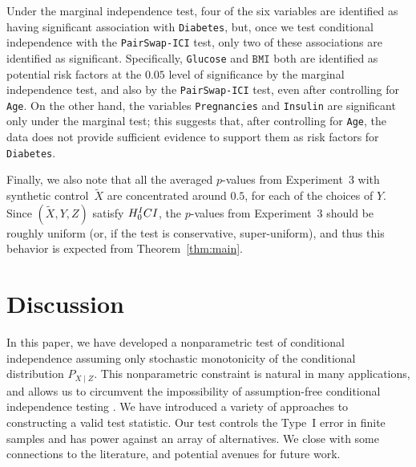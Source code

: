 \documentclass[12pt]{article}
\begin{document}
Under the marginal independence test, four of the six variables are identified as having significant association with \texttt{Diabetes}, but, once we test conditional independence with the \textnormal{\texttt{PairSwap-ICI}} test, only two of these associations are identified as significant. 
Specifically, \texttt{Glucose} and $\texttt{BMI}$ both are identified as potential risk factors at the $0.05$ level of significance by the marginal independence test, and also by the \textnormal{\texttt{PairSwap-ICI}} test, even after controlling for \texttt{Age}.
On the other hand, the variables \texttt{Pregnancies} and \texttt{Insulin} are significant only under the marginal test; this suggests that, after controlling for \texttt{Age}, the data does not provide sufficient evidence to support them as risk factors for \texttt{Diabetes}.

Finally, we also note that all the averaged $p$-values from Experiment~3 with synthetic control~$\tilde{X}$ are concentrated around $0.5$, for each of the choices of $Y$. Since $(\tilde{X},Y,Z)$ satisfy $H_0^\textnormal{ICI}$, the $p$-values from Experiment~3 should be roughly uniform (or, if the test is conservative, super-uniform), and thus this behavior is expected from Theorem~\ref{thm:main}.

\section{Discussion}\label{sec:discussion}

In this paper, we have developed a nonparametric test of conditional independence assuming only stochastic monotonicity of the conditional distribution $P_{X\mid Z}$. 
This nonparametric constraint is natural in many applications, and allows us to circumvent the impossibility of assumption-free conditional independence testing \citep{shah2020hardness}.
We have introduced a variety of approaches to constructing a valid test statistic. 
Our test controls the Type~I error in finite samples and has power against an array of alternatives. We close with some connections to the literature, and potential avenues for future work.
\end{document}
